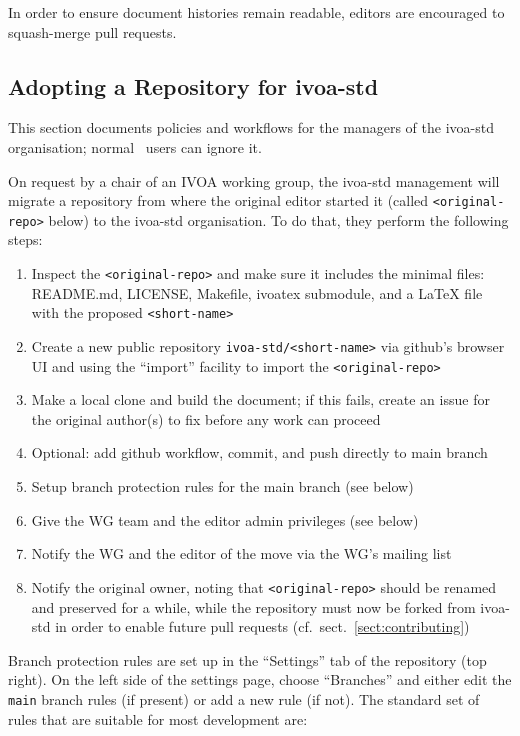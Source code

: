 \documentclass[11pt,a4paper]{ivoa}
\begin{document}
In order to ensure document histories remain readable, editors are
encouraged to squash-merge pull requests.

\subsection{Adopting a Repository for ivoa-std}

This section documents policies and workflows for the managers of the
ivoa-std organisation; normal \ivoatex~users can ignore it.

On request by a chair of an IVOA working group, the ivoa-std management
will migrate a repository from where the original editor started it
(called \verb|<original-repo>| below) to the ivoa-std organisation.  To
do that, they perform the following steps:

\begin{enumerate}
\item Inspect the \verb|<original-repo>| and make sure it includes the minimal
files: README.md, LICENSE, Makefile, ivoatex submodule, and a LaTeX
file with the proposed \verb|<short-name>|
\item Create a new public repository \verb|ivoa-std/<short-name>| via github's
browser UI and using the ``import'' facility to import the \verb|<original-repo>|
\item Make a local clone and build the document; if this fails, create an issue
for the original author(s) to fix before any work can proceed
\item Optional: add github workflow, commit, and push directly to main branch
\item Setup branch protection rules for the main branch (see below)
\item Give the WG team and the editor admin privileges (see below)
\item Notify the WG and the editor of the move via the WG's mailing list
\item Notify the original owner, noting that \verb|<original-repo>|
should be renamed and preserved for a while, while the repository must
now be forked from ivoa-std in order to enable future pull requests
(cf.~sect.~\ref{sect:contributing})
\end{enumerate}

Branch protection rules are set up in the ``Settings'' tab of the repository (top right). 
On the left side of the settings page, choose ``Branches'' and either edit the \verb|main|
branch rules (if present) or add a new rule (if not). The standard set of rules that are
suitable for most development are:
\end{document}
